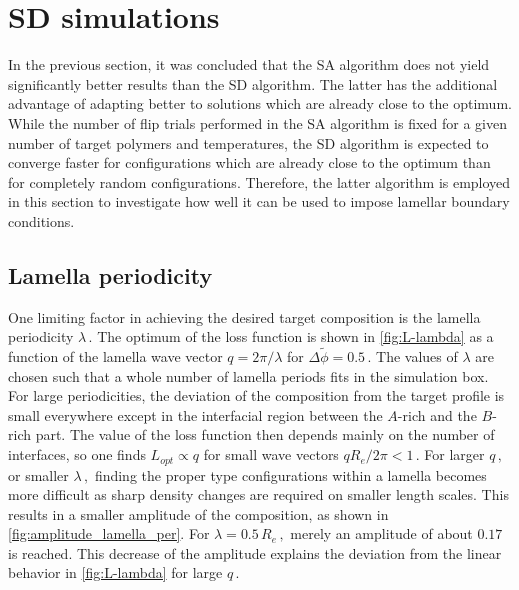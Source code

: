 \documentclass[bachelor,       %
               oneside,        %
               BCOR10mm,       %
               ngerman, english %
               ]{GAUBM}
\begin{document}
\section{SD simulations}

In the previous section, it was concluded that the \ac{SA} algorithm does not yield significantly better results than the \ac{SD} algorithm. The latter has the additional advantage of adapting better to solutions which are already close to the optimum. While the number of flip trials performed in the \ac{SA} algorithm is fixed for a given number of target polymers and temperatures, the \ac{SD} algorithm is expected to converge faster for configurations which are already close to the optimum than for completely random configurations. Therefore, the latter algorithm is employed in this section to investigate how well it can be used to impose lamellar boundary conditions.

\subsection{Lamella periodicity}

One limiting factor in achieving the desired target composition is the lamella periodicity $\lambda\,.$ The optimum of the loss function is shown in \autoref{fig:L-lambda} as a function of the lamella wave vector $q=2\pi/\lambda$ for $\Delta\tilde\phi=0.5\,.$ The values of $\lambda$ are chosen such that a whole number of lamella periods fits in the simulation box. For large periodicities, the deviation of the composition from the target profile is small everywhere except in the interfacial region between the $A$-rich and the $B$-rich part. The value of the loss function then depends mainly on the number of interfaces, so one finds $L_{opt}\propto q$ for small wave vectors $qR_e/2\pi<1\,.$ For larger $q\,,$ or smaller $\lambda\,,$ finding the proper type configurations within a lamella becomes more difficult as sharp density changes are required on smaller length scales. This results in a smaller amplitude of the composition, as shown in \autoref{fig:amplitude_lamella_per}. For $\lambda=0.5\,R_e\,,$ merely an amplitude of about $0.17$ is reached. This decrease of the amplitude explains the deviation from the linear behavior in \autoref{fig:L-lambda} for large $q\,.$ 
\end{document}

